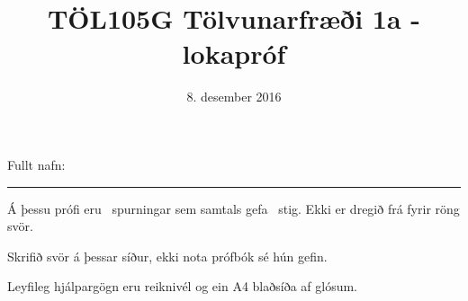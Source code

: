 \documentclass[addpoints]{exam}
\author{}
\date{}
\title{TÖL105G Tölvunarfræði 1a - lokapróf}
\author{}
\date{8. desember 2016}
\begin{document}
Fullt nafn: \vspace*{1mm} \hrule
\vspace*{0.5cm}

\begin{center}
\begin{minipage}{.8\textwidth}
Á þessu prófi eru \numquestions\ spurningar sem samtals gefa \numpoints\ stig.
Ekki er dregið frá fyrir röng svör.

Skrifið svör á þessar síður, ekki nota prófbók sé hún gefin.

Leyfileg hjálpargögn eru reiknivél og ein A4 blaðsíða af glósum.
\end{minipage}
\end{center}

\vspace{1cm}
\end{document}
